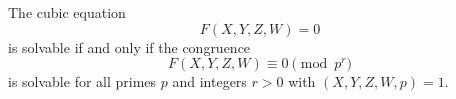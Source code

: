 \begin{proposition}\label{eq:188}
    The cubic equation
\[
    F(X,Y,Z,W)=0
\]
    is solvable if and only if the congruence
\[
    F(X,Y,Z,W)\equiv0\pmod {p^r}
\]
    is solvable for all primes $p$ and integers $r>0$ with $(X,Y,Z,W,p)=1$.
\end{proposition}

